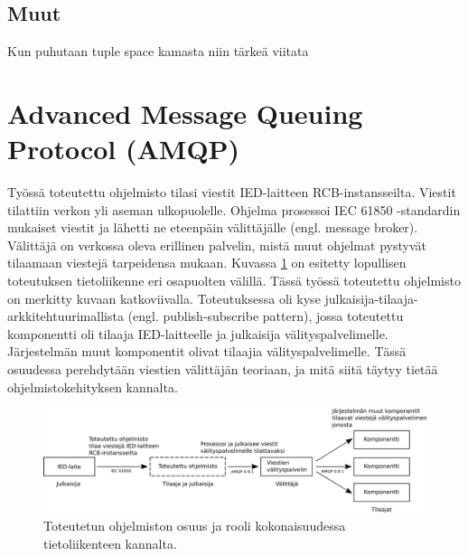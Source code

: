 

\subsection{Muut}
Kun puhutaan tuple space kamasta niin tärkeä viitata \cite{generative-communication-in-linda}



\section{Advanced Message Queuing Protocol (AMQP)}
\label{ch:amqp-theory}
Työssä toteutettu ohjelmisto tilasi viestit IED-laitteen RCB-instansseilta. Viestit tilattiin verkon yli aseman ulkopuolelle. Ohjelma prosessoi IEC 61850 -standardin mukaiset viestit ja lähetti ne eteenpäin välittäjälle (engl. message broker). Välittäjä on verkossa oleva erillinen palvelin, mistä muut ohjelmat pystyvät tilaamaan viestejä tarpeidensa mukaan. Kuvassa \ref{fig:implemented-system-communication} on esitetty lopullisen toteutuksen tietoliikenne eri osapuolten välillä. Tässä työssä toteutettu ohjelmisto on merkitty kuvaan katkoviivalla. Toteutuksessa oli kyse julkaisija-tilaaja-arkkitehtuurimallista (engl. publish-subscribe pattern), jossa toteutettu komponentti oli tilaaja IED-laitteelle ja julkaisija välityspalvelimelle. Järjestelmän muut komponentit olivat tilaajia välityspalvelimelle. Tässä osuudessa perehdytään viestien välittäjän teoriaan, ja mitä siitä täytyy tietää ohjelmistokehityksen kannalta.

\begin{figure}[ht!]
	\includegraphics[width=1\textwidth]{pictures/implemented-system-communication.png}
	\caption{Toteutetun ohjelmiston osuus ja rooli kokonaisuudessa tietoliikenteen kannalta.}
	\label{fig:implemented-system-communication}
\end{figure}

